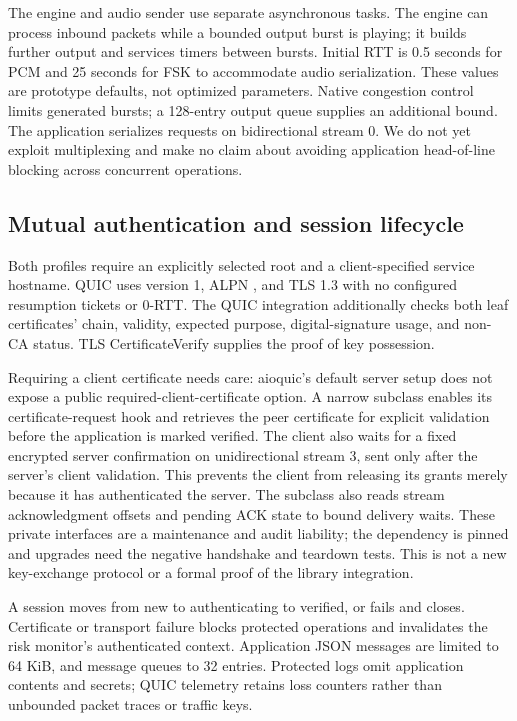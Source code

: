 The engine and audio sender use separate asynchronous tasks. The engine can
process inbound packets while a bounded output burst is playing; it builds
further output and services timers between bursts. Initial RTT is 0.5 seconds
for PCM and 25 seconds for FSK to accommodate audio serialization. These values
are prototype defaults, not optimized parameters. Native congestion control
limits generated bursts; a 128-entry output queue supplies an additional bound.
The application serializes requests on bidirectional stream 0. We do not yet
exploit multiplexing and make no claim about avoiding application head-of-line
blocking across concurrent operations.

\subsection{Mutual authentication and session lifecycle}
Both profiles require an explicitly selected root and a client-specified
service hostname. QUIC uses version 1, ALPN , and TLS 1.3 with
no configured resumption tickets or 0-RTT. The QUIC integration additionally
checks both leaf certificates' chain, validity, expected purpose,
digital-signature usage, and non-CA status. TLS CertificateVerify supplies
the proof of key possession.

Requiring a client certificate needs care: aioquic's default server setup does
not expose a public required-client-certificate option. A narrow subclass
enables its certificate-request hook and retrieves the peer certificate for
explicit validation before the application is marked verified. The client
also waits for a fixed encrypted server confirmation on unidirectional stream
3, sent only after the server's client validation. This prevents the client
from releasing its grants merely because it has authenticated the server.
The subclass also reads stream acknowledgment offsets and pending ACK state
to bound delivery waits. These private interfaces are a maintenance and audit
liability; the dependency is pinned and upgrades need the negative handshake
and teardown tests. This is not a new key-exchange protocol or a formal proof
of the library integration.

A session moves from new to authenticating to verified, or fails and closes.
Certificate or transport failure blocks protected operations and invalidates
the risk monitor's authenticated context. Application JSON messages are limited
to 64 KiB, and message queues to 32 entries. Protected logs omit application
contents and secrets; QUIC telemetry retains loss counters rather than
unbounded packet traces or traffic keys.

